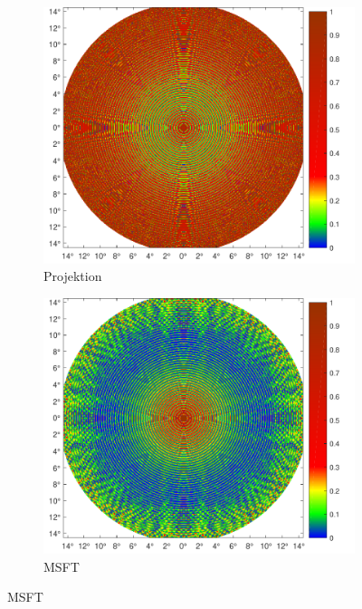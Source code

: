 \begin{figure} %
	\centering
	\begin{subfigure}[b]{0.49\textwidth}
		\includegraphics[width=\textwidth]{images/fig_sim_relerror_FTproj-r100-bd1e-3.pdf}
		\caption{Projektion}
	\end{subfigure}
	\begin{subfigure}[b]{0.49\textwidth}
		\includegraphics[width=\textwidth]{images/fig_sim_relerror_msft-r100-bd1e-3.pdf}
		\caption{MSFT}
	\end{subfigure}

\end{figure}
